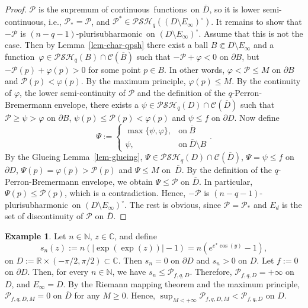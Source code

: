 \documentclass[reqno]{amsart}
\theoremstyle{definition}
\newtheorem{ex}[thm]{Example}
\numberwithin{equation}{section}
\newcommand{\nbb}{\mathbb{N}}
\newcommand{\cbb}{\mathbb{C}}
\newcommand{\rbb}{\mathbb{R}}
\newcommand{\ccal}{\mathcal{C}}
\newcommand{\pcal}{\mathcal{P}}
\newcommand{\psh}{pluri\-sub\-harmonic}
\newcommand{\PSH}{\mathcal{PSH}}
\newcommand{\cl}[1]{\overline{#1}}
\newcommand{\cont}{continuous}
\newcommand{\lsc}{lower semi-continuous}
\newcommand{\fct}{function}
\newcommand{\fcts}{functions}
\newcommand{\cld}{\overline{D}}
\newcommand{\relc}{\Subset}
\newcommand{\vphi}{\varphi}
\begin{document}
\begin{proof} $\pcal$ is the supremum of \cont\ \fcts\ on $\cld$, so it is \lsc, i.e., $\pcal_*=\pcal$, and $\pcal^* \in \PSH_q((D\setminus E_\infty)^\circ)$. It remains to show that $-\pcal$ is $(n-q-1)$-\psh\ on $(D\setminus E_\infty)^\circ$. Assume that this is not the case. Then by Lemma~\ref{lem-char-qpsh} there exist a ball $B \relc D\setminus E_\infty$ and a \fct\ $\varphi \in \PSH_q(B) \cap \ccal(\cl{B})$ such that $-\pcal + \varphi < 0$ on $\partial B$, but $-\pcal(p) + \varphi(p) >0$ for some point $p \in B$. In other words, $\vphi<\pcal\leq M$ on $\partial B$ and $\pcal(p) < \varphi(p)$. By the maximum principle, $\varphi(p)\leq M$. By the continuity of $\varphi$, the lower semi-continuity of $\pcal$ and the definition of the $q$-Perron-Bremermann envelope, there exists a $\psi \in \PSH_q(D) \cap \ccal(\cld)$ such that $\pcal \geq \psi > \varphi$ on $\partial B$,  $\psi(p)\leq\pcal(p) < \varphi(p)$ and $\psi \leq f$ on $\partial D$. Now define
\[
\Psi:= \begin{cases} \max\{\psi, \varphi\}, & \text{on}\ \cl{B}\\ \psi, & \text{on}\ \cld\setminus B \end{cases}.
\]
By the Glueing Lemma~\ref{lem-glueing}, $\Psi \in \PSH_q(D) \cap \ccal(\cld)$, $\Psi=\psi \leq f$ on $\partial D$, $\Psi(p)= \varphi(p) > \pcal(p)$ and $\Psi \leq M$ on~$\cld$. By the definition of the $q$-Perron-Bremermann envelope, we obtain $\Psi \leq \pcal$ on $\cld$. In particular, $\Psi(p) \leq \pcal(p)$, which is a contradiction. Hence, $-\pcal$ is $(n-q-1)$-\psh\ on $(D\setminus E_\infty)^\circ$. The rest is obvious, since $\pcal=\pcal_*$ and $E_d$ is the set of discontinuity of $\pcal$ on $\cld$.
\end{proof}

\begin{ex} Let $n \in \nbb$, $z \in \cbb$, and define
\[
s_n(z):=n(|\exp(\exp(z))|-1)=n(e^{e^x\cos(y)}-1),
\]
on $D:=\rbb\times(-\pi/2,\pi/2) \subset \cbb$. Then $s_n=0$ on $\partial D$ and $s_n>0$ on $D$. Let $f:=0$ on $\partial D$. Then, for every $n \in \nbb$, we have $s_n \leq \pcal_{f,q,D}$. Therefore, $\pcal_{f,q,D}=+\infty$ on $D$, and $E_\infty=D$. By the Riemann mapping theorem and the maximum principle, $\pcal_{f,q,D,M}=0$ on $\cld$ for any $M \geq 0$. Hence, $\sup_{M<+\infty}\pcal_{f,q,D,M} < \pcal_{f,q,D}$ on $D$. 
\end{ex}
\end{document}
